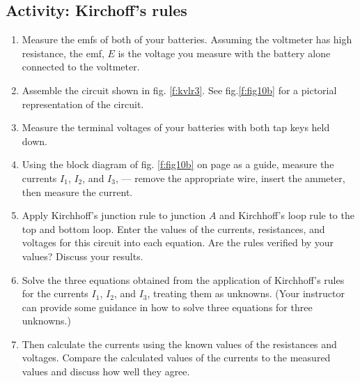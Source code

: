 \subsection{Activity: Kirchoff's rules}
\begin{enumerate}
	 \item Measure the emfs of both of your batteries.  Assuming the voltmeter has high resistance, the emf, $E$ is the voltage you measure with the battery alone connected to the voltmeter.
	\item Assemble the circuit shown in fig. \ref{f:kvlr3}.
	See fig.\ref{f:fig10b} for a pictorial representation of the circuit.
	\item Measure the terminal voltages of your batteries with both tap keys held down.
	\item Using the block diagram of fig. \ref{f:fig10b} on page \pageref{f:fig10b} as a guide, measure the currents $I_1$, $I_2$, and $I_3$, --- remove the appropriate wire, insert the ammeter, then measure the current.
	\item Apply Kirchhoff's junction rule to junction $A$ and Kirchhoff's loop rule to the top and bottom loop.  Enter the values of the currents, resistances, and voltages for this circuit into each equation.  Are the rules verified by your values? Discuss your results.
	\item Solve the three equations obtained from the application of Kirchhoff's rules for the currents $I_1$, $I_2$, and $I_3$, treating them as unknowns. (Your instructor can provide some guidance in how to solve three equations for three unknowns.)
	\item Then calculate the currents using the known values of the resistances and voltages.  Compare the calculated values of the currents to the measured values and discuss how well they agree. 
\end{enumerate}

